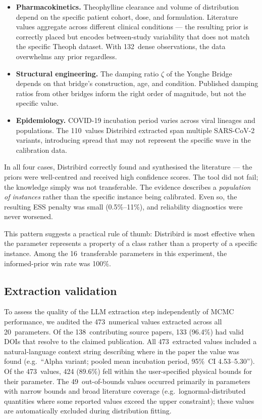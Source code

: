 \documentclass[11pt,a4paper]{article}
\begin{document}
\begin{itemize}
  \item \textbf{Pharmacokinetics.} Theophylline clearance and volume of distribution depend on the specific patient cohort, dose, and formulation. Literature values aggregate across different clinical conditions --- the resulting prior is correctly placed but encodes between-study variability that does not match the specific Theoph dataset. With 132~dense observations, the data overwhelms any prior regardless.

  \item \textbf{Structural engineering.} The damping ratio $\zeta$ of the Yonghe Bridge depends on that bridge's construction, age, and condition. Published damping ratios from other bridges inform the right order of magnitude, but not the specific value.

  \item \textbf{Epidemiology.} COVID-19 incubation period varies across viral lineages and populations. The 110~values Distribird extracted span multiple SARS-CoV-2 variants, introducing spread that may not represent the specific wave in the calibration data.
\end{itemize}

In all four cases, Distribird correctly found and synthesised the literature --- the priors were well-centred and received high confidence scores. The tool did not fail; the knowledge simply was not transferable. The evidence describes a \emph{population of instances} rather than the specific instance being calibrated. Even so, the resulting ESS penalty was small (0.5\%--11\%), and reliability diagnostics were never worsened.

This pattern suggests a practical rule of thumb: Distribird is most effective when the parameter represents a property of a class rather than a property of a specific instance. Among the 16~transferable parameters in this experiment, the informed-prior win rate was 100\%.

\subsection{Extraction validation}

To assess the quality of the LLM extraction step independently of MCMC performance, we audited the 473~numerical values extracted across all 20~parameters. Of the 138~contributing source papers, 133 (96.4\%) had valid DOIs that resolve to the claimed publication. All 473~extracted values included a natural-language context string describing where in the paper the value was found (e.g.\ ``Alpha variant; pooled mean incubation period, 95\%~CI 4.53--5.30''). Of the 473~values, 424 (89.6\%) fell within the user-specified physical bounds for their parameter. The 49~out-of-bounds values occurred primarily in parameters with narrow bounds and broad literature coverage (e.g.\ lognormal-distributed quantities where some reported values exceed the upper constraint); these values are automatically excluded during distribution fitting.
\end{document}
